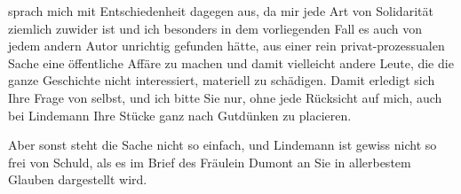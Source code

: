                sprach mich mit Entschiedenheit dagegen aus, da mir jede Art von Solidarität ziemlich
               zuwider ist und ich besonders in dem vorliegenden Fall es auch von jedem andern Autor
               unrichtig gefunden hätte, aus einer rein \introOben{}privat-\introOben{}prozessualen Sache eine \introOben{}öffentliche\introOben{} Affäre zu
               machen und damit vielleicht  andere Leute, die
               die ganze Geschichte nicht interessiert, materiell zu schädigen. Damit erledigt sich
               Ihre Frage von selbst, und ich bit{\pb}te Sie nur, ohne jede
               Rücksicht auf mich, auch bei Lindemann Ihre
               Stücke ganz nach Gutdünken zu placieren.\pend
           
\pstart
           Aber sonst steht die Sache nicht so einfach, und Lindemann ist gewiss nicht so frei von Schuld, als es im Brief des Fräulein
                  Dumont an Sie in allerbestem Glauben
               dargestellt wird.\pend
           
